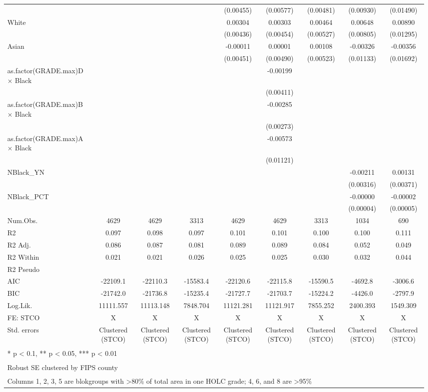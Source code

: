 \documentclass[
]{article}
\begin{document}
\begin{table}
{\begin{tabular}[t]{lcccccccc}
 &  &  &  & (0.00455) & (0.00577) & (0.00481) & (0.00930) & (0.01490)\\
White &  &  &  & 0.00304 & 0.00303 & 0.00464 & 0.00648 & 0.00890\\
 &  &  &  & (0.00436) & (0.00454) & (0.00527) & (0.00805) & (0.01295)\\
Asian &  &  &  & -0.00011 & 0.00001 & 0.00108 & -0.00326 & -0.00356\\
 &  &  &  & (0.00451) & (0.00490) & (0.00523) & (0.01133) & (0.01692)\\
as.factor(GRADE.max)D × Black &  &  &  &  & -0.00199 &  &  & \\
 &  &  &  &  & (0.00411) &  &  & \\
as.factor(GRADE.max)B × Black &  &  &  &  & -0.00285 &  &  & \\
 &  &  &  &  & (0.00273) &  &  & \\
as.factor(GRADE.max)A × Black &  &  &  &  & -0.00573 &  &  & \\
 &  &  &  &  & (0.01121) &  &  & \\
NBlack\_YN &  &  &  &  &  &  & -0.00211 & 0.00131\\
 &  &  &  &  &  &  & (0.00316) & (0.00371)\\
NBlack\_PCT &  &  &  &  &  &  & -0.00000 & -0.00002\\
 &  &  &  &  &  &  & (0.00004) & (0.00005)\\
\midrule
Num.Obs. & 4629 & 4629 & 3313 & 4629 & 4629 & 3313 & 1034 & 690\\
R2 & 0.097 & 0.098 & 0.097 & 0.101 & 0.101 & 0.100 & 0.100 & 0.111\\
R2 Adj. & 0.086 & 0.087 & 0.081 & 0.089 & 0.089 & 0.084 & 0.052 & 0.049\\
R2 Within & 0.021 & 0.021 & 0.026 & 0.025 & 0.025 & 0.030 & 0.032 & 0.044\\
R2 Pseudo &  &  &  &  &  &  &  & \\
AIC & -22109.1 & -22110.3 & -15583.4 & -22120.6 & -22115.8 & -15590.5 & -4692.8 & -3006.6\\
BIC & -21742.0 & -21736.8 & -15235.4 & -21727.7 & -21703.7 & -15224.2 & -4426.0 & -2797.9\\
Log.Lik. & 11111.557 & 11113.148 & 7848.704 & 11121.281 & 11121.917 & 7855.252 & 2400.393 & 1549.309\\
FE: STCO & X & X & X & X & X & X & X & X\\
Std. errors & Clustered (STCO) & Clustered (STCO) & Clustered (STCO) & Clustered (STCO) & Clustered (STCO) & Clustered (STCO) & Clustered (STCO) & Clustered (STCO)\\
\bottomrule
\multicolumn{9}{l}{\textsuperscript{} * p < 0.1, ** p < 0.05, *** p < 0.01}\\
\multicolumn{9}{l}{\textsuperscript{} Robust SE clustered by FIPS county}\\
\multicolumn{9}{l}{\textsuperscript{} Columns 1, 2, 3, 5 are blokgroups with >80\% of total area in one HOLC grade; 4, 6, and 8 are >95\%}\\
\end{tabular}}
\end{table}
\end{document}

